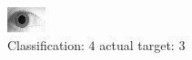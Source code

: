 \begin{figure}[h!]
\begin{center}
\includegraphics[width=0.60\columnwidth]{figures/ID1916_class_4_target_3.png}
\end{center}
\caption{ Classification: 4 actual target: 3}
\label{fig:ID1916_class_4_target_3}
\end{figure}
